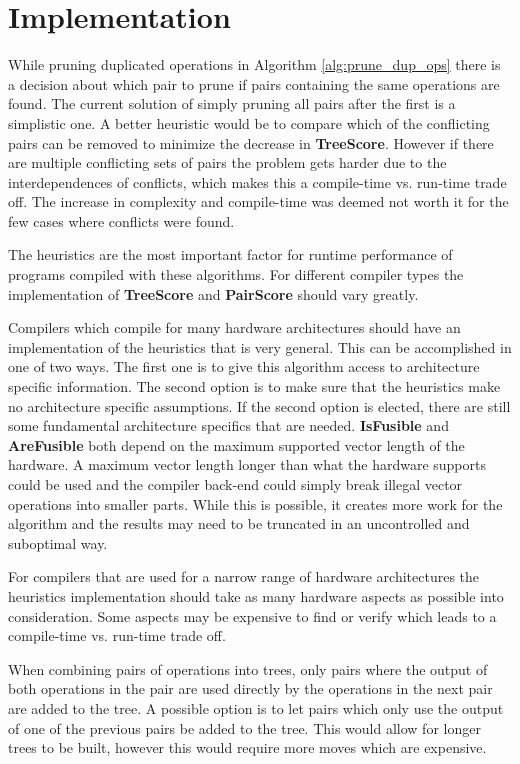 \documentclass[12pt,a4paper,onecolumn,twoside,openright]{report}
\begin{document}
\section{Implementation}
While pruning duplicated operations in Algorithm \ref{alg:prune_dup_ops} there is a decision about which pair to prune if pairs containing the same operations are found. The current solution of simply pruning all pairs after the first is a simplistic one. A better heuristic would be to compare which of the conflicting pairs can be removed to minimize the decrease in \textbf{TreeScore}. However if there are multiple conflicting sets of pairs the problem gets harder due to the interdependences of conflicts, which makes this a compile-time vs. run-time trade off. The increase in complexity and compile-time was deemed not worth it for the few cases where conflicts were found.


The heuristics are the most important factor for runtime performance of programs compiled with these algorithms. For different compiler types the implementation of \textbf{TreeScore} and \textbf{PairScore} should vary greatly. 

Compilers which compile for many hardware architectures should have an implementation of the heuristics that is very general. This can be accomplished in one of two ways. The first one is to give this algorithm access to architecture specific information. The second option is to make sure that the heuristics make no architecture specific assumptions. If the second option is elected, there are still some fundamental architecture specifics that are needed. \textbf{IsFusible} and \textbf{AreFusible} both depend on the maximum supported vector length of the hardware. A maximum vector length longer than what the hardware supports could be used and the compiler back-end could simply break illegal vector operations into smaller parts. While this is possible, it creates more work for the algorithm and the results may need to be truncated in an uncontrolled and suboptimal way.

For compilers that are used for a narrow range of hardware architectures the heuristics implementation should take as many hardware aspects as possible into consideration. Some aspects may be expensive to find or verify which leads to a compile-time vs. run-time trade off.

When combining pairs of operations into trees, only pairs where the output of both operations in the pair are used directly by the operations in the next pair are added to the tree. A possible option is to let pairs which only use the output of one of the previous pairs be added to the tree. This would allow for longer trees to be built, however this would require more moves which are expensive.
\end{document}

